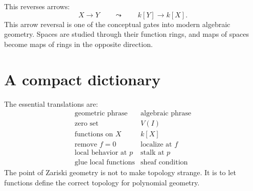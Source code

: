 This reverses arrows:
\[
  X\longrightarrow Y
  \qquad\leadsto\qquad
  k[Y]\longrightarrow k[X].
\]
This arrow reversal is one of the conceptual gates into modern algebraic geometry.  Spaces are studied through their function rings, and maps of spaces become maps of rings in the opposite direction.

\section{A compact dictionary}

The essential translations are:
\[
\begin{array}{c|c}
\text{geometric phrase} & \text{algebraic phrase}\\
\hline
\text{zero set} & V(I)\\
\text{functions on }X & k[X]\\
\text{remove }f=0 & \text{localize at }f\\
\text{local behavior at }p & \text{stalk at }p\\
\text{glue local functions} & \text{sheaf condition}
\end{array}
\]
The point of Zariski geometry is not to make topology strange. It is to let functions define the correct topology for polynomial geometry.
